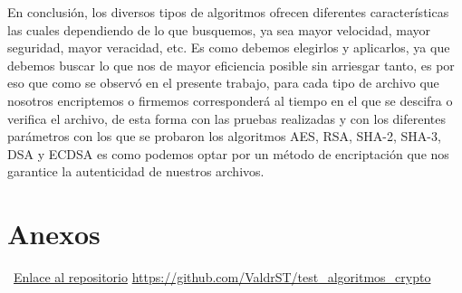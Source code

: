 \documentclass[onecolumn]{IEEEtran}
\begin{document}
En conclusión, los diversos tipos de algoritmos ofrecen diferentes características las cuales dependiendo de lo que busquemos, ya sea mayor velocidad, mayor seguridad, mayor veracidad, etc. Es como debemos elegirlos y aplicarlos, ya que debemos buscar lo que nos de mayor eficiencia posible sin arriesgar tanto, es por eso que como se observó en el presente trabajo, para cada tipo de archivo que nosotros encriptemos o firmemos corresponderá al tiempo en el que se descifra o verifica el archivo, de esta forma con las pruebas realizadas y con los diferentes parámetros con los que se probaron los algoritmos AES, RSA, SHA-2, SHA-3, DSA y ECDSA es como podemos optar por un método de encriptación que nos garantice la autenticidad de nuestros archivos.
\nocite{*}

\newpage{}

\section*{Anexos}

\listoffigures{}
\listoftables{}
\listoflistings{}
\bigskip{}
\faGithub~\href{https://github.com/ValdrST/test_algoritmos_crypto}{Enlace al repositorio}
\dotfill
\href{https://github.com/ValdrST/test_algoritmos_crypto}{https://github.com/ValdrST/test\_algoritmos\_crypto}

\printbibliography{}
\end{document}
